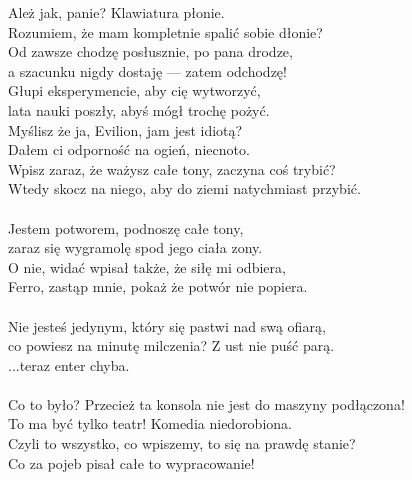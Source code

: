 \charprzy{}
Ależ jak, panie? Klawiatura płonie.\\
Rozumiem, że mam kompletnie spalić sobie dłonie?\\
Od zawsze chodzę posłusznie, po pana drodze,\\
a szacunku nigdy dostaję --- zatem odchodzę!\\

\chardok{}
Głupi eksperymencie, aby cię wytworzyć,\\
lata nauki poszły, abyś mógł trochę pożyć.\\
Myślisz że ja, Evilion, jam jest idiotą?\\
Dałem ci odporność na ogień, niecnoto.\\
Wpisz zaraz, że ważysz całe tony, zaczyna coś trybić?\\
Wtedy skocz na niego, aby do ziemi natychmiast przybić.\\

\\

\charmik{}
Jestem potworem, podnoszę całe tony,\\
zaraz się wygramolę spod jego ciała zony.\\
O nie, widać wpisał także, że siłę mi odbiera,\\
Ferro, zastąp mnie, pokaż że potwór nie popiera.\\

\\

\charfer{}
Nie jesteś jedynym, który się pastwi nad swą ofiarą,\\
co powiesz na minutę milczenia? Z ust nie puść parą.\\
 ...teraz enter chyba.\\

\\

\charfer{}
Co to było? Przecież ta konsola nie jest do maszyny podłączona!\\
To ma być tylko teatr! Komedia niedorobiona.\\
Czyli to wszystko, co wpiszemy, to się na prawdę stanie?\\
Co za pojeb pisał całe to wypracowanie!\\

